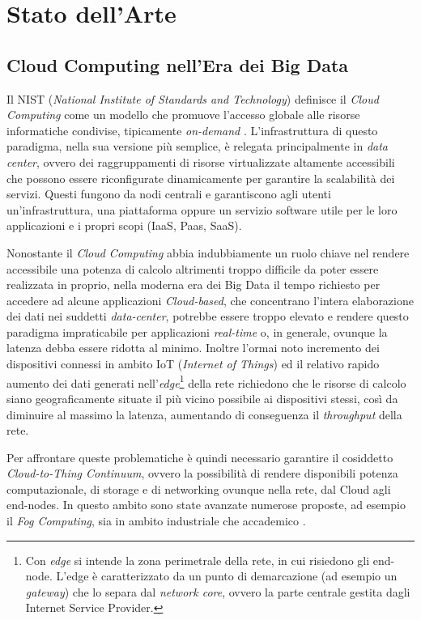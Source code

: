 \chapter{Stato dell'Arte}

\section{Cloud Computing nell'Era dei Big Data}

Il NIST (\textit{National Institute of Standards and Technology}) definisce il \textit{Cloud Computing} come un modello che promuove l'accesso globale alle risorse informatiche condivise, tipicamente \textit{on-demand} \cite{NISTCloudComputing}. L'infrastruttura di questo paradigma, nella sua versione più semplice, è relegata principalmente in \textit{data center}, ovvero dei raggruppamenti di risorse virtualizzate altamente accessibili che possono essere riconfigurate dinamicamente per garantire la scalabilità dei servizi. Questi fungono da nodi centrali e garantiscono agli utenti un'infrastruttura, una piattaforma oppure un servizio software utile per le loro applicazioni e i propri scopi (IaaS, Paas, SaaS).

Nonostante il \textit{Cloud Computing} abbia indubbiamente un ruolo chiave nel rendere accessibile una potenza di calcolo altrimenti troppo difficile da poter essere realizzata in proprio, nella moderna era dei Big Data il tempo richiesto per accedere ad alcune applicazioni \textit{Cloud-based}, che concentrano l'intera elaborazione dei dati nei suddetti \textit{data-center}, potrebbe essere troppo elevato e rendere questo paradigma impraticabile per applicazioni \textit{real-time} o, in generale, ovunque la latenza debba essere ridotta al minimo. Inoltre l'ormai noto incremento dei dispositivi connessi in ambito IoT (\textit{Internet of Things}) ed il relativo rapido aumento dei dati generati nell'\textit{edge}\footnote{Con \textit{edge} si intende la zona perimetrale della rete, in cui risiedono gli end-node. L'edge è caratterizzato da un punto di demarcazione (ad esempio un \textit{gateway}) che lo separa dal \textit{network core}, ovvero la parte centrale gestita dagli Internet Service Provider.} della rete richiedono che le risorse di calcolo siano geograficamente situate il più vicino possibile ai dispositivi stessi, così da diminuire al massimo la latenza, aumentando di conseguenza il \textit{throughput} della rete.

Per affrontare queste problematiche è quindi necessario garantire il cosiddetto \textit{Cloud-to-Thing Continuum}, ovvero la possibilità di rendere disponibili potenza computazionale, di storage e di networking ovunque nella rete, dal Cloud agli end-nodes. In questo ambito sono state avanzate numerose proposte, ad esempio il \textit{Fog Computing}, sia in ambito industriale che accademico \cite{OpenFogReferenceArchitecture, FogComputingInIoT}.

